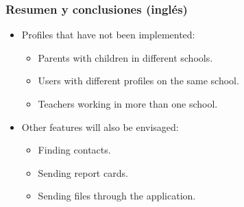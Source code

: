 \begin{frame} [fragile]
	\frametitle{Resumen y conclusiones (inglés)}
	\begin{itemize}
		\item Profiles that have not been implemented:
			\begin{itemize}
				\item Parents with children in different schools.
				\item Users with different profiles on the same school.
				\item Teachers working in more than one school.
			\end{itemize}
		\item Other features will also be envisaged:
			\begin{itemize}
				\item Finding contacts.
				\item Sending report cards.
				\item Sending files through the application.
				\end{itemize}
	\end{itemize}
	\endblock{}
\end{frame}